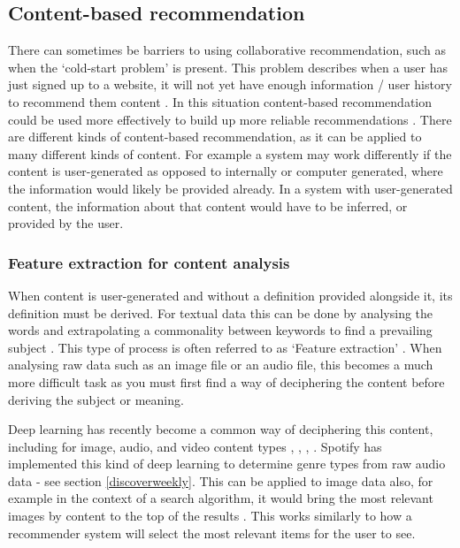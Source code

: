 \documentclass[a4paper,12pt]{report}
\begin{document}
    \subsection{Content-based recommendation}
      There can sometimes be barriers to using collaborative recommendation, such as when the ‘cold-start problem’ is present. This problem describes when a user has just signed up to a website, it will not yet have enough information / user history to recommend them content \citep{schein2002methods}.
      In this situation content-based recommendation could be used more effectively to build up more reliable recommendations \citep{lops2011content}.
      There are different kinds of content-based recommendation, as it can be applied to many different kinds of content. For example a system may work differently if the content is user-generated as opposed to internally or computer generated, where the information would likely be provided already. In a system with user-generated content, the information about that content would have to be inferred, or provided by the user.

      \subsubsection{Feature extraction for content analysis}
        When content is user-generated and without a definition provided alongside it, its definition must be derived. For textual data this can be done by analysing the words and extrapolating a commonality between keywords to find a prevailing subject \citep{sanderson1999deriving}.
        This type of process is often referred to as ‘Feature extraction’ \citep{guyon2006introduction}.
        When analysing raw data such as an image file or an audio file, this becomes a much more difficult task as you must first find a way of deciphering the content before deriving the subject or meaning.

        Deep learning has recently become a common way of deciphering this content, including for image, audio, and video content types \citep{coates2011analysis}, \citep{ciregan2012multi}, \citep{lee2009unsupervised}, \citep{mobahi2009deep}.
        Spotify has implemented this kind of deep learning to determine genre types from raw audio data - see section \ref{discoverweekly}.
        This can be applied to image data also, for example in the context of a search algorithm, it would bring the most relevant images by content to the top of the results \citep{yee2003faceted}. This works similarly to how a recommender system will select the most relevant items for the user to see.
\end{document}
